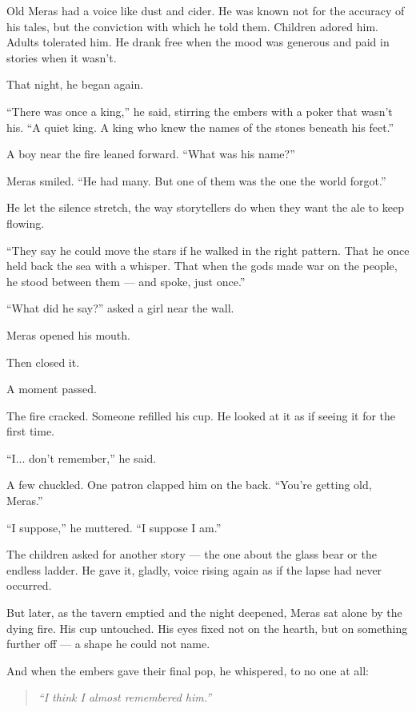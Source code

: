 \documentclass[9pt]{article}
\begin{document}
Old Meras had a voice like dust and cider. He was known not for the accuracy of his tales, but the conviction with which he told them. Children adored him. Adults tolerated him. He drank free when the mood was generous and paid in stories when it wasn’t.

That night, he began again.

``There was once a king,'' he said, stirring the embers with a poker that wasn’t his. ``A quiet king. A king who knew the names of the stones beneath his feet.''

A boy near the fire leaned forward. ``What was his name?''

Meras smiled. ``He had many. But one of them was the one the world forgot.''

He let the silence stretch, the way storytellers do when they want the ale to keep flowing.

``They say he could move the stars if he walked in the right pattern. That he once held back the sea with a whisper. That when the gods made war on the people, he stood between them — and spoke, just once.''

``What did he say?'' asked a girl near the wall.

Meras opened his mouth.

Then closed it.

A moment passed.

The fire cracked. Someone refilled his cup. He looked at it as if seeing it for the first time.

``I... don’t remember,'' he said.

A few chuckled. One patron clapped him on the back. ``You’re getting old, Meras.''

``I suppose,'' he muttered. ``I suppose I am.''

The children asked for another story — the one about the glass bear or the endless ladder. He gave it, gladly, voice rising again as if the lapse had never occurred.

But later, as the tavern emptied and the night deepened, Meras sat alone by the dying fire. His cup untouched. His eyes fixed not on the hearth, but on something further off — a shape he could not name.

And when the embers gave their final pop, he whispered, to no one at all:

\begin{quote}
\emph{``I think I almost remembered him.''}
\end{quote}
\end{document}
